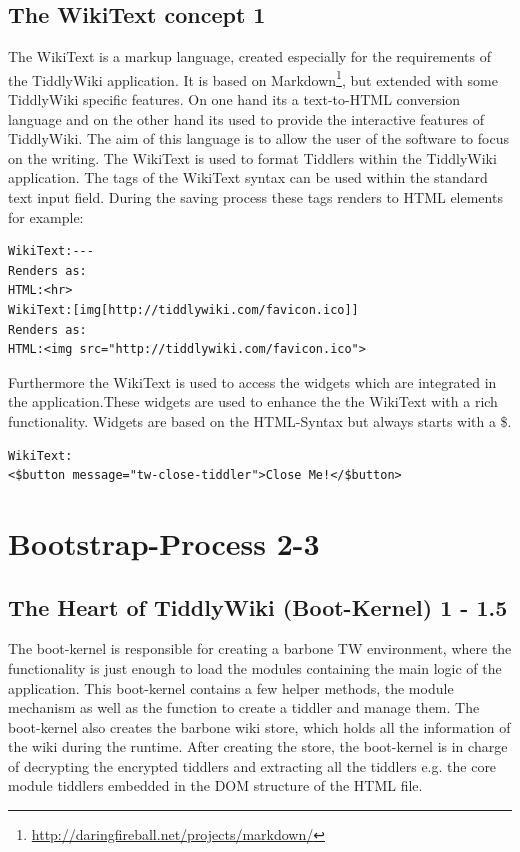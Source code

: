 \documentclass[12pt,a4paper]{article}
\begin{document}
\subsection{The WikiText concept 1}
The WikiText is a markup language, created especially for the requirements of the TiddlyWiki application. It is based on Markdown\footnote{\url{http://daringfireball.net/projects/markdown/}}, but extended with some TiddlyWiki specific features.  On one hand its a text-to-HTML conversion language and on the other hand its used to provide the interactive features of TiddlyWiki. The aim of this language is to allow the user of the software to focus on the writing.\cite{TIDD:WIKITEXT} The WikiText is used to format Tiddlers within the TiddlyWiki application. The tags of the WikiText syntax can be used within the standard text input field. 
During the saving process these tags renders to HTML elements for example:
\begin{lstlisting}[caption={Example use of WikiText},label=lst:data-div]
WikiText:--- 
Renders as:
HTML:<hr>
WikiText:[img[http://tiddlywiki.com/favicon.ico]]
Renders as: 
HTML:<img src="http://tiddlywiki.com/favicon.ico">
\end{lstlisting}
Furthermore the WikiText is used to access the widgets which are integrated in the application.These widgets are used to enhance the the WikiText with a rich functionality. Widgets are based on the HTML-Syntax but always starts with a \$.
\begin{lstlisting}[caption={Example use of widgets within WikiText},label=lst:data-div]
WikiText:
<$button message="tw-close-tiddler">Close Me!</$button> 
\end{lstlisting}
\newpage
\section{Bootstrap-Process 2-3}
\subsection{The Heart of TiddlyWiki (Boot-Kernel) 1 - 1.5}
The boot-kernel is responsible for creating a barbone TW environment, where the functionality is just enough to load the modules containing the main logic of the application. This boot-kernel contains a few helper methods, the module mechanism as well as the function to create a tiddler and manage them. The boot-kernel also creates the barbone wiki store, which holds all the information of the wiki during the runtime. After creating the store, the boot-kernel is in charge of decrypting the encrypted tiddlers and extracting all the tiddlers e.g. the core module tiddlers embedded in the DOM structure of the HTML file. 
\end{document}
